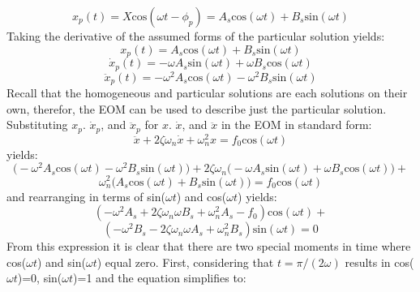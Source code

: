 \documentclass[12pt,letter]{article}
\numberwithin{ex}{section} %
\numberwithin{re}{section} %
\begin{document}
			\begin{equation}
				x_p(t) = X \text{cos}(\omega t - \phi_p) = A_s \text{cos}(\omega t) + B_s  \text{sin}(\omega t)
			\end{equation}			 
			Taking the derivative of the assumed forms of the particular solution yields:
			\begin{equation}
				x_p(t) = A_s \text{cos}(\omega t) + B_s  \text{sin}(\omega t)
			\end{equation}	
			\begin{equation}
				\dot{x}_p(t) = -\omega A_s \text{sin}(\omega t) + \omega B_s  \text{cos}(\omega t)
			\end{equation}				 
			\begin{equation}
				\ddot{x}_p(t) = -\omega^2 A_s \text{cos}(\omega t) - \omega^2 B_s  \text{sin}(\omega t)
			\end{equation}				
			Recall that the homogeneous and particular solutions are each solutions on their own, therefor, the EOM can be used to describe just the particular solution. Substituting $x_p$. $\dot{x}_p$, and $\ddot{x}_p$ for $x$. $\dot{x}$, and $\ddot{x}$ in the EOM in standard form:
			\begin{equation}
			 	\ddot{x}+2 \zeta \omega_n \dot{x} +\omega_n^2x = f_0\text{cos}(\omega t)
			\end{equation}
			yields:
			\begin{equation}
			 	\big(	-\omega^2 A_s \text{cos}(\omega t) - \omega^2 B_s  \text{sin}(\omega t) \big)+2 \zeta \omega_n  \big( -\omega A_s \text{sin}(\omega t) + \omega B_s  \text{cos}(\omega t)  \big) +
			\end{equation}
			\begin{equation*}
				\omega_n^2 \big( A_s \text{cos}(\omega t) + B_s  \text{sin}(\omega t) \big) = f_0\text{cos}(\omega t)
			\end{equation*}				
			and rearranging in terms of sin($\omega t$) and cos($\omega t$) yields: 
			\begin{equation}
				(-\omega^2 A_s + 2 \zeta \omega_n \omega B_s + \omega_n^2 A_s -f_0) \text{cos}(\omega t) + 
			\end{equation}
			\begin{equation*}
				(-\omega^2 B_s - 2 \zeta \omega_n \omega A_s + \omega_n^2 B_s)\text{sin}(\omega t) =0
			\end{equation*}	
			From this expression it is clear that there are two special moments in time where cos($\omega t$) and sin($\omega t$) equal zero. First, considering that $t=\pi/(2\omega)$ results in cos($\omega t$)=0, sin($\omega t$)=1 and the equation simplifies to:
\end{document}
